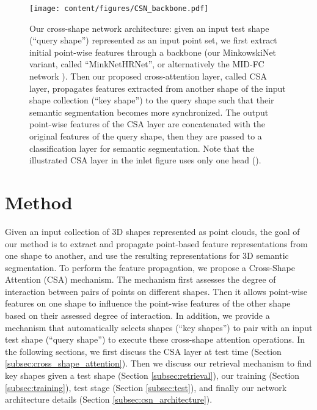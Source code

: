 \documentclass{egpubl}
\begin{document}
\begin{figure*}[!t]
    \centering
    \texttt{[image: content/figures/CSN\_backbone.pdf]}
    \vspace{-10mm}
    \caption{Our cross-shape network architecture: given an input test shape (``query shape'') represented as an input point set, we first extract initial point-wise features through a backbone (our MinkowskiNet variant, called ``MinkNetHRNet'', or alternatively the MID-FC network \cite{Wang:2021}). Then our proposed cross-attention layer, called CSA layer, propagates
    features extracted from another shape of the input shape collection (``key shape'') to the query shape such that their semantic segmentation becomes more synchronized. The output point-wise features of the CSA layer are concatenated with the original features of the query shape, then they are passed to a classification layer for semantic segmentation. Note that the illustrated CSA layer in the inlet figure uses only one head ().}
    \label{fig:csn_architecture}
    \vspace{-5mm}
\end{figure*}
 
\vspace*{-2mm}
\section{Method}
\label{sec:method}

Given an input collection of 3D shapes represented as point clouds, the goal of our method is to extract and propagate point-based feature representations from one shape to
another, and use the resulting representations for 3D semantic segmentation. To perform the feature propagation, we propose a Cross-Shape Attention (CSA) mechanism. The mechanism first assesses the degree of interaction between pairs of points on different shapes. Then it
allows point-wise features on one shape to influence the point-wise features of the other shape based on their assessed degree of interaction. In addition, we  provide a mechanism that automatically selects shapes (``key shapes'') to pair with an input test shape (``query shape'') to execute these cross-shape attention operations. In the following sections, we first discuss the CSA layer at test time (Section \ref{subsec:cross_shape_attention}). Then we discuss our retrieval mechanism to find key shapes given a test shape (Section \ref{subsec:retrieval}), our training (Section \ref{subsec:training}),  test stage (Section \ref{subsec:test}),
and finally our network architecture details (Section \ref{subsec:csn_architecture}).
\end{document}
